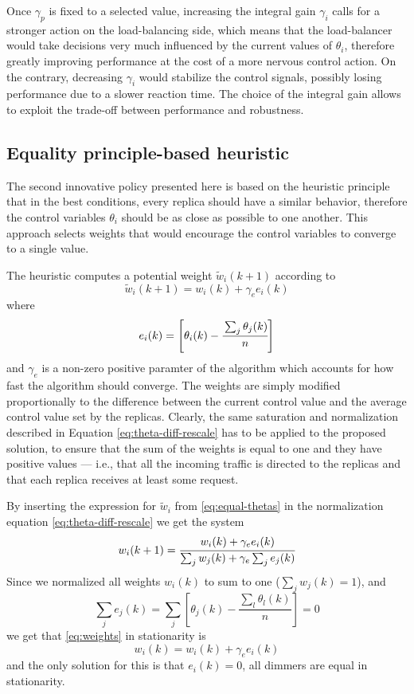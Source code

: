 Once $\gamma_p$ is fixed to a selected value, increasing the integral
gain $\gamma_i$ calls for a stronger action on the load-balancing
side, which means that the load-balancer would take decisions very
much influenced by the current values of $\theta_i$, therefore greatly
improving performance at the cost of a more nervous control action. On
the contrary, decreasing $\gamma_i$ would stabilize the control
signals, possibly losing performance due to a slower reaction
time. The choice of the integral gain allows to exploit the trade-off
between performance and robustness.

\subsection{Equality principle-based heuristic}

The second innovative policy presented here is based on the heuristic principle
that in the best conditions, every replica should have a similar
behavior, therefore the control variables $\theta_i$ should be as
close as possible to one another. This approach selects weights that
would encourage the control variables to converge to a single value.

The heuristic computes a potential weight $\tilde{w}_i(k+1)$ according
to
\begin{equation}
  \tilde{w}_i(k+1) = w_i(k) + \gamma_e e_i(k)
\label{eq:equal-thetas}
\end{equation}
where
$$e_i(k)=\left[ \theta_i (k) - \cfrac{\sum_j \theta_j (k) }{n} \right]$$
and $\gamma_e$ is a non-zero positive paramter of the algorithm which accounts
for how fast the algorithm should converge. The weights are simply modified
proportionally to the difference between the current control value and
the average control value set by the replicas. Clearly, the same
saturation and normalization described in Equation
\eqref{eq:theta-diff-rescale} has to be applied to the proposed
solution, to ensure that the sum of the weights is equal to one and
they have positive values --- i.e., that all the incoming traffic is
directed to the replicas and that each replica receives at least some
request.

By inserting the expression for $\tilde w_i$ from \eqref{eq:equal-thetas}
in the normalization equation \eqref{eq:theta-diff-rescale} we get the system
\begin{equation}
  w_i(k+1)=\cfrac{w_i(k)+\gamma_ee_i(k)}{\sum_jw_j(k)+\gamma_e\sum_je_j(k)}
\label{eq:weights}
\end{equation}
Since we normalized all weights $w_i(k)$ to sum to one ($\sum_jw_j(k)=1$), and
$$\sum_je_j(k)=\sum_j\left[\theta_j(k)-\frac{\sum_l\theta_l(k)}{n}\right]=0$$
we get that \eqref{eq:weights} in stationarity is
$$w_i(k)=w_i(k)+\gamma_ee_i(k)$$
and the only solution for this is that $e_i(k)=0$, all dimmers are equal in
stationarity.

